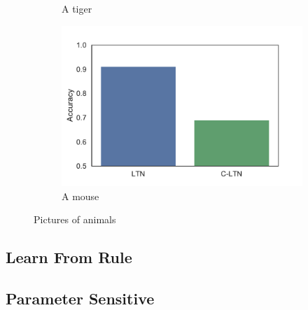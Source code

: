 \begin{figure}
\begin{subfigure}[b]{0.3\textwidth}
        \caption{A tiger}
        \label{fig:tiger}
    \end{subfigure}
    \begin{subfigure}[b]{0.3\textwidth}
        \includegraphics[]{img/bar1}
        \caption{A mouse}
        \label{fig:mouse}
    \end{subfigure}
    \caption{Pictures of animals}\label{fig:animals}
\end{figure}

\subsection{Learn From Rule}

\subsection{Parameter Sensitive}
